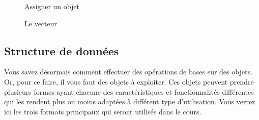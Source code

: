 \documentclass[10.5pt,a4paper]{article}
\begin{document}
    \begin{figure}[H]
    \centering
    \caption{Assigner un objet}
    \label{struObj}
    \end{figure}
    
    \begin{figure}[H]
    \centering
    \caption{Le vecteur}
    \label{struVec1}
    \end{figure}
  
  \subsection{Structure de données}
  Vous savez désormais comment effectuer des opérations de bases sur des objets. Or, pour ce faire, il vous faut des objets à exploiter. Ces objets peuvent prendre plusieurs formes ayant chacune des caractéristiques et fonctionnalités différentes qui les rendent plus ou moins adaptées à différent type d'utilisation. Vous verrez ici les trois formats principaux qui seront utilisés dans le cours. 
  
\end{document}
